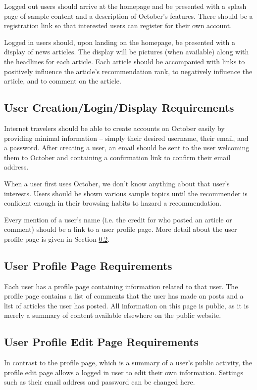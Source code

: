 \documentclass[11pt,letterpaper]{article}
\begin{document}
Logged out users should arrive at the homepage and be presented with a splash page of sample content and a description of October's features.
There should be a registration link so that interested users can register for their own account.

Logged in users should, upon landing on the homepage, be presented with a display of news articles.
The display will be pictures (when available) along with the headlines for each article.
Each article should be accompanied with links to positively influence the article's recommendation rank, to negatively influence the article, and to comment on the article.

\subsection{User Creation/Login/Display Requirements}
Internet travelers should be able to create accounts on October easily by providing minimal information -- simply their desired username, their email, and a password.
After creating a user, an email should be sent to the user welcoming them to October and containing a confirmation link to confirm their email address.

When a user first uses October, we don't know anything about that user's interests. Users should be shown various sample topics until the recommender is confident enough in their browsing habits to hazard a recommendation.

Every mention of a user's name (i.e. the credit for who posted an article or comment) should be a link to a user profile page. More detail about the user profile page is given in Section \ref{sec:profilepage}.

\subsection{User Profile Page Requirements}
\label{sec:profilepage}
Each user has a profile page containing information related to that user.
The profile page contains a list of comments that the user has made on posts and a list of articles the user has posted.
All information on this page is public, as it is merely a summary of content available elsewhere on the public website.

\subsection{User Profile Edit Page Requirements}
In contrast to the profile page, which is a summary of a user's public activity, the profile edit page allows a logged in user to edit their own information.
Settings such as their email address and password can be changed here.
\end{document}
